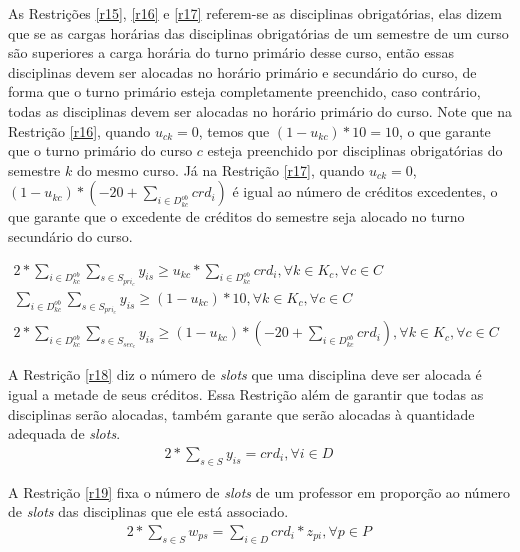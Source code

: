 As Restrições \ref{r15}, \ref{r16} e \ref{r17} referem-se as disciplinas obrigatórias, elas dizem que se as cargas horárias das disciplinas obrigatórias de um semestre de um curso são superiores a carga horária do turno primário desse curso, então essas disciplinas devem ser alocadas no horário primário e secundário do curso, de forma que o turno primário esteja completamente preenchido, caso contrário, todas as disciplinas devem ser alocadas no horário primário do curso. Note que na Restrição \ref{r16}, quando $u_{ck} = 0$, temos que $(1 - u_{kc}) * 10 = 10$, o que garante que o turno primário do curso $c$ esteja preenchido por disciplinas obrigatórias do semestre $k$ do mesmo curso. Já na Restrição \ref{r17}, quando $u_{ck} = 0$, $(1 - u_{kc}) * (-20+\sum_{i \in{D_{kc}^{ob}}}^{}{crd_i})$ é igual ao número de créditos excedentes, o que garante que o excedente de créditos do semestre seja alocado no turno secundário do curso.
 
\begin{eqnarray}
\label{r15}
2*\sum_{i \in{D_{kc}^{ob}}}^{}{\sum_{s\in{S_{pri_c}}}^{}{y_{is}}}\geq u_{kc} * \sum_{i \in{D_{kc}^{ob}}}^{}{crd_i}, \forall{k}\in{K_c}, \forall{c}\in{C}  &&\\
\label{r16}
\sum_{i \in{D_{kc}^{ob}}}^{}{\sum_{s \in{S_{pri_c}}}^{}{y_{is}}} \geq (1 - u_{kc}) * 10, \forall{k}\in{K_c}, \forall{c}\in{C}  &&\\
\label{r17}
2*\sum_{i \in{D_{kc}^{ob}}}^{}{\sum_{s \in{S_{sec_c}}}^{}{y_{is}}}\geq (1 - u_{kc}) * (-20+\sum_{i \in{D_{kc}^{ob}}}^{}{crd_i}),\forall{k}\in{K_c}, \forall{c}\in{C}&&
\end{eqnarray}

A Restrição \ref{r18} diz o número de \textit{slots} que uma disciplina deve ser alocada é igual a metade de seus créditos. Essa Restrição além de garantir que todas as disciplinas serão alocadas, também garante que serão alocadas à quantidade adequada de \textit{slots}.
\begin{eqnarray}
\label{r18}
2*\sum_{s \in S}^{}{y_{is}} = crd_i, \forall{i}\in{D}  &&
\end{eqnarray}

A Restrição \ref{r19} fixa o número de \textit{slots} de um professor em proporção ao número de \textit{slots} das disciplinas que ele está associado.
\begin{eqnarray}
\label{r19}
2 * \sum_{s \in S}^{}{w_{ps}} = \sum_{i \in D}^{}{crd_i * z_{pi}}, \forall{p}\in{P} &&
\end{eqnarray}

